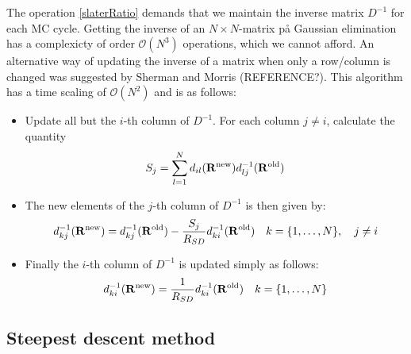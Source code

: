 \documentclass[english, a4paper]{article}
\begin{document}
\noindent The operation \eqref{slaterRatio} demands that we maintain the inverse matrix $D^{-1}$ for each
MC cycle. Getting the inverse of an $N\times N$-matrix på Gaussian elimination has a complexicty of order
$\mathcal{O}(N^3)$ operations, which we cannot afford. An alternative way of updating the inverse
of a matrix when only a row/column is changed was suggested by Sherman and Morris (REFERENCE?). 
This algorithm has a time scaling
of $\mathcal{O}(N^2)$ and is as follows:
\begin{itemize}
 \item Update all but the $i$-th column of $D^{-1}$. For each column $j\neq i$,
 calculate the quantity 
 $$S_j = \sum_{l=1}^N d_{il} ({\bf R}^{\textrm{new}}) d_{lj}^{-1} ({\bf R}^{\textrm{old}})$$
 \item The new elements of the $j$-th column of $D^{-1}$ is then given by: 
 $$d_{kj}^{-1}({\bf R}^{\textrm{new}}) = d_{kj}^{-1}({\bf R}^{\textrm{old}}) - \frac{S_j}{R_{SD}}
 d_{ki}^{-1}({\bf R}^{\textrm{old}}) \quad k = \{1,\dots,N\}, \quad j \neq i$$
 \item Finally the $i$-th column of $D^{-1}$ is updated simply as follows:
 $$d_{ki}^{-1}({\bf R}^{\textrm{new}}) = \frac{1}{R_{SD}} d_{ki}^{-1}({\bf R}^{\textrm{old}}) \quad
 k = \{1,\dots,N\}$$
\end{itemize}













\subsection{Steepest descent method}
\end{document}
